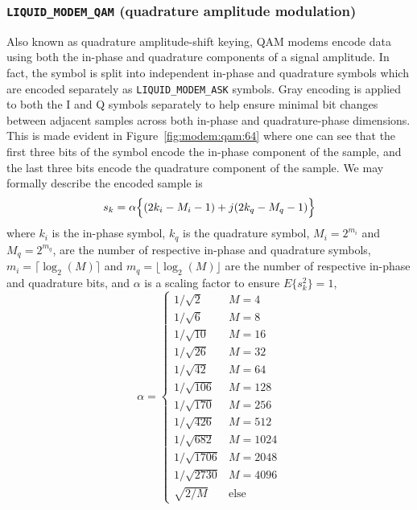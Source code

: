 \subsubsection{{\tt LIQUID\_MODEM\_QAM} (quadrature amplitude modulation)}
\label{module:modem:digital:QAM}
Also known as quadrature amplitude-shift keying, QAM modems encode data using
both the in-phase and quadrature components of a signal amplitude.
In fact, the symbol is split into independent in-phase and quadrature symbols
which are encoded separately as {\tt LIQUID\_MODEM\_ASK} symbols.
Gray encoding is applied to both the I and Q symbols separately to help
ensure minimal bit changes between adjacent samples across both in-phase and
quadrature-phase dimensions.
This is made evident in Figure~\ref{fig:modem:qam:64} where one can see that
the first three bits of the symbol encode the in-phase component of the
sample, and the last three bits encode the quadrature component of the sample.
%
We may formally describe the encoded sample is
%
\begin{equation}
    s_k = \alpha \Bigl\{ ( 2 k_i - M_i - 1 ) + j(2 k_q - M_q - 1) \Bigr\}
\end{equation}
%
where
$k_i$ is the in-phase symbol,
$k_q$ is the quadrature symbol,
$M_i = 2^{m_i}$ and $M_q = 2^{m_q}$, are the number of respective in-phase and
quadrature symbols,
$m_i=\lceil \log_2(M) \rceil$ and $m_q=\lfloor \log_2(M) \rfloor$ are the
number of respective in-phase and quadrature bits, and
$\alpha$ is a scaling factor to ensure $E\{s_k^2\}=1$,
%
\begin{equation}
    \alpha = 
    \begin{cases}
    1/\sqrt{2}      &   M=4     \\
    1/\sqrt{6}      &   M=8     \\
    1/\sqrt{10}     &   M=16    \\
    1/\sqrt{26}     &   M=32    \\
    1/\sqrt{42}     &   M=64    \\
    1/\sqrt{106}    &   M=128   \\
    1/\sqrt{170}    &   M=256   \\
    1/\sqrt{426}    &   M=512   \\
    1/\sqrt{682}    &   M=1024  \\
    1/\sqrt{1706}   &   M=2048  \\
    1/\sqrt{2730}   &   M=4096  \\
    \sqrt{2/M}      &   \text{else}
    \end{cases}
\end{equation}
